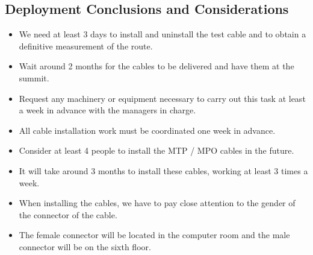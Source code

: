   \subsection{Deployment Conclusions and Considerations}
  \begin{itemize}
    \item We need at least 3 days to install and uninstall the test cable and to obtain a definitive measurement of the route.
    \item Wait around 2 months for the cables to be delivered and have them at the summit.
    \item Request any machinery or equipment necessary to carry out this task at least a week in advance with the managers in charge. 
    \item All cable installation work must be coordinated one week in advance.
    \item Consider at least 4 people to install the MTP / MPO cables in the future.
    \item It will take around 3 months to install these cables, working at least 3 times a week.
    \item When installing the cables, we have to pay close attention to the gender of the connector of the cable.
    \item The female connector will be located in the computer room and the male connector will be on the sixth floor.
  \end{itemize}














  









